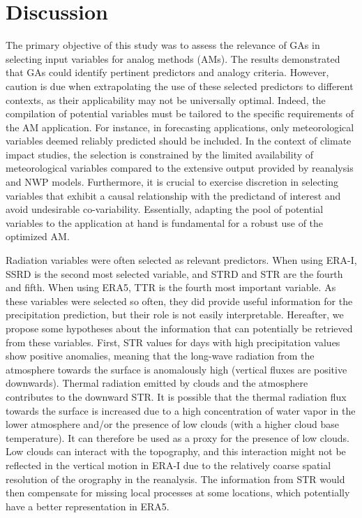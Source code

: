 \documentclass[draft]{agujournal2019}
\begin{document}
\section{Discussion}
\label{discussion}

The primary objective of this study was to assess the relevance of GAs in selecting input variables for analog methods (AMs). The results demonstrated that GAs could identify pertinent predictors and analogy criteria. However, caution is due when extrapolating the use of these selected predictors to different contexts, as their applicability may not be universally optimal. Indeed, the compilation of potential variables must be tailored to the specific requirements of the AM application. For instance, in forecasting applications, only meteorological variables deemed reliably predicted should be included. In the context of climate impact studies, the selection is constrained by the limited availability of meteorological variables compared to the extensive output provided by reanalysis and NWP models. Furthermore, it is crucial to exercise discretion in selecting variables that exhibit a causal relationship with the predictand of interest and avoid undesirable co-variability. Essentially, adapting the pool of potential variables to the application at hand is fundamental for a robust use of the optimized AM.

Radiation variables were often selected as relevant predictors. When using ERA-I, SSRD is the second most selected variable, and STRD and STR are the fourth and fifth. When using ERA5, TTR is the fourth most important variable. As these variables were selected so often, they did provide useful information for the precipitation prediction, but their role is not easily interpretable. Hereafter, we propose some hypotheses about the information that can potentially be retrieved from these variables. First, STR values for days with high precipitation values show positive anomalies, meaning that the long-wave radiation from the atmosphere towards the surface is anomalously high (vertical fluxes are positive downwards). Thermal radiation emitted by clouds and the atmosphere contributes to the downward STR. It is possible that the thermal radiation flux towards the surface is increased due to a high concentration of water vapor in the lower atmosphere and/or the presence of low clouds (with a higher cloud base temperature). It can therefore be used as a proxy for the presence of low clouds. Low clouds can interact with the topography, and this interaction might not be reflected in the vertical motion in ERA-I due to the relatively coarse spatial resolution of the orography in the reanalysis. The information from STR would then compensate for missing local processes at some locations, which potentially have a better representation in ERA5.
\end{document}

